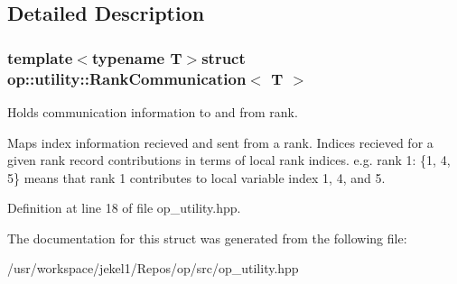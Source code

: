 \subsection{Detailed Description}
\subsubsection*{template$<$typename T$>$struct op\-::utility\-::\-Rank\-Communication$<$ T $>$}

Holds communication information to and from rank. 

Maps index information recieved and sent from a rank. Indices recieved for a given rank record contributions in terms of local rank indices. e.\-g. rank 1\-: \{1, 4, 5\} means that rank 1 contributes to local variable index 1, 4, and 5. 

Definition at line 18 of file op\-\_\-utility.\-hpp.



The documentation for this struct was generated from the following file\-:\begin{DoxyCompactItemize}
\item 
/usr/workspace/jekel1/\-Repos/op/src/op\-\_\-utility.\-hpp\end{DoxyCompactItemize}
